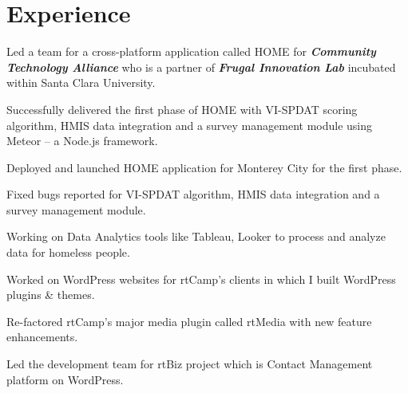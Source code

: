 \documentclass[]{deedy-resume-openfont}
\begin{document}
\begin{minipage}[t]{0.66\textwidth} 


\section{Experience}

\vspace{\topsep} %
\begin{tightemize}
\item Led a team for a cross-platform application called HOME for \textbf{\textit{Community Technology Alliance}} who is a partner of \textbf{\textit{Frugal Innovation Lab}} incubated within Santa Clara University.
\item Successfully delivered the first phase of HOME with VI-SPDAT scoring algorithm, HMIS data integration and a survey management module using Meteor – a Node.js framework.
\end{tightemize}
\sectionsep

\begin{tightemize}
\item Deployed and launched HOME application for Monterey City for the first phase.
\item Fixed bugs reported for VI-SPDAT algorithm, HMIS data integration and a survey management module.
\item Working on Data Analytics tools like Tableau, Looker to process and analyze data for homeless people.
\end{tightemize}
\sectionsep

\begin{tightemize}
\item Worked on WordPress websites for rtCamp's clients in which I built WordPress plugins \& themes.
\item Re-factored rtCamp's major media plugin called rtMedia with new feature enhancements.
\item Led the development team for rtBiz project which is Contact Management platform on WordPress.
\end{tightemize}
\sectionsep


\end{minipage}
\end{document}
